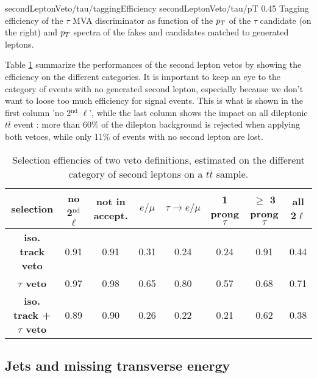                      {secondLeptonVeto/tau/taggingEfficiency}
                     {secondLeptonVeto/tau/pT}
                     {0.45}
                     {Tagging efficiency of the $\tau$ MVA discriminator as function of the 
                     $p_T$ of the $\tau$ candidate (on the right) and $p_T$ spectra of 
                     the fakes and candidates matched to generated leptons.}

    Table \ref{tab:secondLeptonVetoPerformances} summarize the performances of the 
    second lepton vetos by showing the efficiency on the different categories. 
    It is important to keep an eye to the category of events with no generated second lepton,
    especially because we don't want to loose too much efficiency for signal events.
    This is what is shown in the first column 'no 2$^\text{nd}$ $\ell$', while the last 
    column shows the impact on all dileptonic $t\bar{t}$ event : more than 60\% of the dilepton 
    background is rejected when applying both vetoes, while only 11\% of events with no
    second lepton are lost.

    \begin{table}
    \hspace*{-1.2cm}
    \begin{tabular}{|c|c|ccccc|c|}
        \hline
        \textbf{selection}                  & no 2$^\text{nd}$ $\ell$ & not in accept. & $e/\mu$ & $\tau \rightarrow e/\mu$ & 1 prong $\tau $ & $\geq$ 3 prong $\tau$ & all 2$\ell$ \\
        \hline
        \textbf{iso. track veto}            & 0.91                    & 0.91  & 0.31  & 0.24  & 0.24  & 0.91  & 0.44  \\  
        \textbf{$\tau$ veto}                & 0.97                    & 0.98  & 0.65  & 0.80  & 0.57  & 0.68  & 0.71  \\
        \hline
        \textbf{iso. track + $\tau$ veto}   & 0.89                    & 0.90  & 0.26  & 0.22  & 0.21  & 0.62  & 0.38 \\
        \hline
    \end{tabular}
        \caption{Selection effiencies of two veto definitions, estimated on the different category of second leptons on a $t\bar{t}$ sample.}
        \label{tab:secondLeptonVetoPerformances}
    \end{table}

        \subsection{Jets and missing transverse energy}

